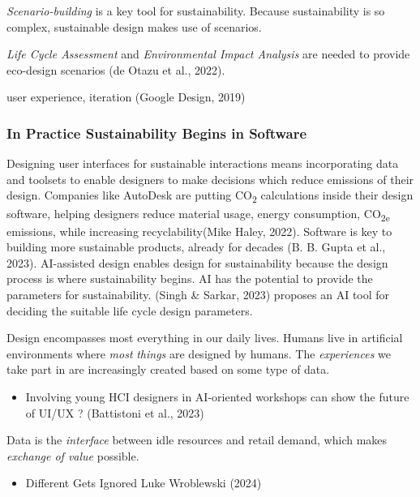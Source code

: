 \documentclass[
  letterpaper,
  DIV=11,
  numbers=noendperiod]{scrartcl}
\providecommand{\tightlist}{%
  \setlength{\itemsep}{0pt}\setlength{\parskip}{0pt}}\usepackage{longtable,booktabs,array}
\begin{document}
\emph{Scenario-building} is a key tool for sustainability. Because
sustainability is so complex, sustainable design makes use of scenarios.

\emph{Life Cycle Assessment} and \emph{Environmental Impact Analysis}
are needed to provide eco-design scenarios (de Otazu et al., 2022).

user experience, iteration (Google Design, 2019)

\subsubsection{In Practice Sustainability Begins in
Software}\label{in-practice-sustainability-begins-in-software}

Designing user interfaces for sustainable interactions means
incorporating data and toolsets to enable designers to make decisions
which reduce emissions of their design. Companies like AutoDesk are
putting CO\textsubscript{2} calculations inside their design software,
helping designers reduce material usage, energy consumption,
CO\textsubscript{2e} emissions, while increasing recyclability(Mike
Haley, 2022). Software is key to building more sustainable products,
already for decades (B. B. Gupta et al., 2023). AI-assisted design
enables design for sustainability because the design process is where
sustainability begins. AI has the potential to provide the parameters
for sustainability. (Singh \& Sarkar, 2023) proposes an AI tool for
deciding the suitable life cycle design parameters.

Design encompasses most everything in our daily lives. Humans live in
artificial environments where \emph{most} \emph{things} are designed by
humans. The \emph{experiences} we take part in are increasingly created
based on some type of data.

\begin{itemize}
\tightlist
\item
  Involving young HCI designers in AI-oriented workshops can show the
  future of UI/UX ? (Battistoni et al., 2023)
\end{itemize}

Data is the \emph{interface} between idle resources and retail demand,
which makes \emph{exchange of value} possible.

\begin{itemize}
\tightlist
\item
  Different Gets Ignored Luke Wroblewski (2024)
\end{itemize}
\end{document}
